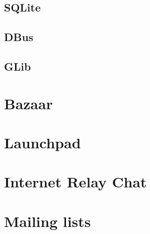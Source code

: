 \subsection{SQLite}
\subsection{DBus}
\subsection{GLib}

\section{Bazaar}
\section{Launchpad}
\section{Internet Relay Chat}
\section{Mailing lists}